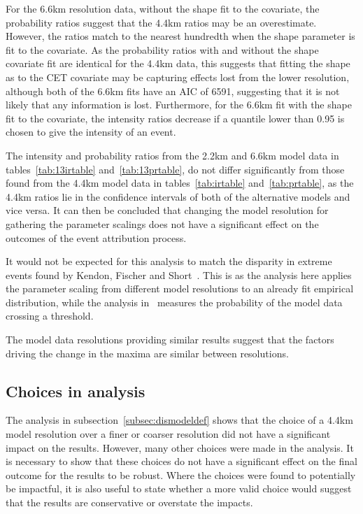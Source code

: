 For the 6.6km resolution data,
    without the shape fit to the covariate,
    the probability ratios suggest that the 4.4km ratios may be an overestimate.
However,
    the ratios match to the nearest hundredth when the shape parameter is fit to the covariate.
As the probability ratios with and without the shape covariate fit are identical for the 4.4km data,
    this suggests that fitting the shape as to the CET covariate may be capturing effects lost from the lower resolution,
    although both of the 6.6km fits have an AIC of 6591, suggesting that it is not likely that any information is lost.
Furthermore, for the 6.6km fit with the shape fit to the covariate,
    the intensity ratios decrease if a quantile lower than 0.95 is chosen to give the intensity of an event.

The intensity and probability ratios from the 2.2km and 6.6km model data in tables~\ref{tab:13irtable} and~\ref{tab:13prtable},
    do not differ significantly from those found from the 4.4km model data in tables~\ref{tab:irtable} and~\ref{tab:prtable},
    as the 4.4km ratios lie in the confidence intervals of both of the alternative models and vice versa.
It can then be concluded that changing the model resolution for gathering the parameter scalings does not have a significant effect
     on the outcomes of the event attribution process.

It would not be expected for this analysis to match the disparity in extreme events found by Kendon, Fischer and Short~\cite{Kendon_Fischer_Short_2023}.
This is as the analysis here applies the parameter scaling from different model resolutions to an already fit empirical distribution,
    while the analysis in~\cite{Kendon_Fischer_Short_2023} measures the probability of the model data crossing a threshold.

The model data resolutions providing similar results suggest that the factors driving the change in the maxima are similar between resolutions.

\subsection{Choices in analysis}\label{subsec:diseventdef}

The analysis in subsection~\ref{subsec:dismodeldef} shows that the choice of a 4.4km model resolution over a finer or coarser resolution
    did not have a significant impact on the results.
However,
    many other choices were made in the analysis.
It is necessary to show that these choices do not have a significant effect on the final outcome for the results to be robust.
Where the choices were found to potentially be impactful,
    it is also useful to state whether a more valid choice would suggest that the results are conservative or overstate the impacts.

